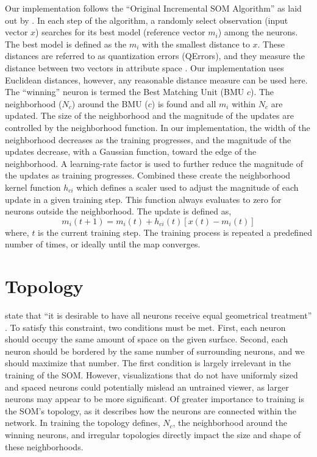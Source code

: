 Our implementation follows the ``Original Incremental SOM Algorithm'' as laid
out by \cite{Kohonen2000}.  In each step of the algorithm, a randomly select
observation (input vector $x$) searches for its best model (reference vector
$m_i$) among the neurons.  The best model is defined as the $m_i$ with the
smallest distance to $x$.  These distances are referred to as quantization
errors (QErrors), and they measure the distance between two vectors in
attribute space \citep{Kohonen2000}.  Our implementation uses Euclidean
distances, however, any reasonable distance measure can be used here.  The
``winning'' neuron is termed the Best Matching Unit (BMU $c$).  The
neighborhood ($N_c$) around the BMU ($c$) is found and all $m_i$ within $N_c$ are
updated.  The size of the neighborhood and the magnitude of the updates are
controlled by the neighborhood function. In our implementation, the width of
the neighborhood decreases as the training progresses, and the magnitude of
the updates decrease, with a Gaussian function, toward the edge of the
neighborhood. A learning-rate factor is used to further reduce the magnitude
of the updates as training progresses.  Combined these create the neighborhood
kernel function $h_{ci}$ which defines a scaler used to adjust the magnitude
of each update in a given training step.  This function always evaluates to
zero for neurons outside the neighborhood.  The update is defined as,
\begin{equation}
  {m_i(t+1)} = m_i(t) +  h_{ci}(t)[x(t) - m_i(t)]
\label{update}
\end{equation}
where, $t$ is the current training step.  The training process is repeated a
predefined number of times, or ideally until the map converges.

\section{Topology}
\label{bg:topo}
\citeauthor{wu2006} state that ``it is desirable to have all
neurons receive equal geometrical treatment'' \cite[p. 900]{wu2006}.  To
satisfy this constraint, two conditions must be met.  First, each neuron
should occupy the same amount of space on the given surface.  Second, each
neuron should be bordered by the same number of surrounding neurons, and we
should maximize that number.  The first condition is largely irrelevant in the
training of the SOM.  However, visualizations that do not have uniformly sized
and spaced neurons could potentially mislead an untrained viewer, as larger
neurons may appear to be more significant. Of greater importance to
training is the SOM's topology, as it describes how the neurons are connected
within the network.  In training the topology defines, $N_c$, the neighborhood
around the winning neurons, and irregular topologies directly impact the size and
shape of these neighborhoods.  

